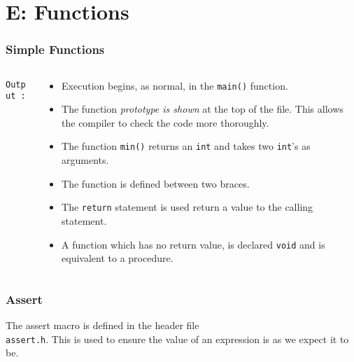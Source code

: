 \section{E: Functions}

\begin{frame}[fragile]
\frametitle{Simple Functions}
\begin{columns}

\begin{column}{0.45\textwidth}

{\scriptsize{\tt Output :}}
\end{column}

\begin{column}{0.45\textwidth}
\begin{itemize}
\item Execution begins, as normal, in the \verb^main()^ function.
\item The function {\it prototype is shown} at the top of the file.
This allows the compiler to check the code more thoroughly.
\item The function \verb^min()^ returns an \verb^int^ and takes
two \verb^int^'s as arguments.
\item The function is defined between two braces.
\item The \verb^return^ statement is used return a value
to the calling statement.
\item A function which has no return value, is declared \verb^void^
and is equivalent to a procedure.
\end{itemize}
\end{column}

\end{columns}
\end{frame}

\begin{frame}[fragile]
\frametitle{Assert}

The assert macro is defined in the header file\\ \verb^assert.h^.
This is used to ensure the value of an expression is as we
expect it to be.
\end{frame}

